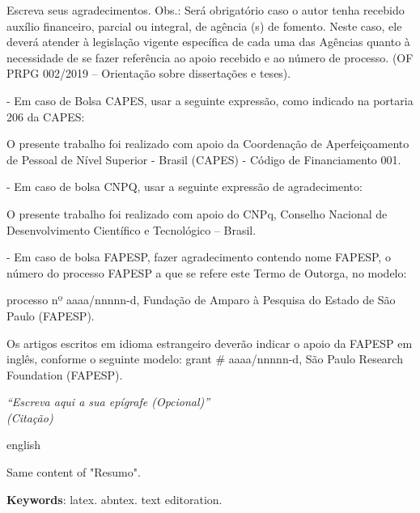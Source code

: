 \begin{agradecimentos}
    Escreva seus agradecimentos.
    Obs.: Será obrigatório caso o autor tenha recebido auxílio financeiro, parcial ou integral, de agência (s) de fomento. Neste caso, ele deverá atender à legislação vigente específica de cada uma das Agências quanto à necessidade de se fazer referência ao apoio recebido e ao número de processo. (OF PRPG 002/2019 – Orientação sobre dissertações e teses).

    -	Em caso de Bolsa CAPES, usar a seguinte expressão, como indicado na portaria 206 da CAPES:

    O presente trabalho foi realizado com apoio da Coordenação de Aperfeiçoamento de Pessoal de Nível Superior - Brasil (CAPES) - Código de Financiamento 001.

    -	Em caso de bolsa CNPQ, usar a seguinte expressão de agradecimento:

    O presente trabalho foi realizado com apoio do CNPq, Conselho Nacional de Desenvolvimento Científico  e Tecnológico – Brasil.

    -	Em caso de bolsa FAPESP, fazer agradecimento contendo nome FAPESP, o número do processo FAPESP a que se refere este Termo de Outorga, no modelo:

    processo nº aaaa/nnnnn-d, Fundação de Amparo à Pesquisa do Estado de São Paulo (FAPESP).

    Os artigos escritos em idioma estrangeiro deverão indicar o apoio da FAPESP em inglês, conforme o seguinte modelo: grant \# aaaa/nnnnn-d, São Paulo Research Foundation (FAPESP).
\end{agradecimentos}

\begin{epigrafe}
    \vspace*{\fill}
    \begin{flushright}
        \textit{``Escreva aqui a sua epígrafe (Opcional)''\\
        (Citação)}
    \end{flushright}
\end{epigrafe}

\begin{resumo}[Abstract]
\begin{otherlanguage*}{english}

    Same content of "Resumo".

    \lipsum[1]

    \vspace{\onelineskip}

    \noindent
    \textbf{Keywords}:
        latex.
        abntex.
        text editoration.
\end{otherlanguage*}
\end{resumo}

